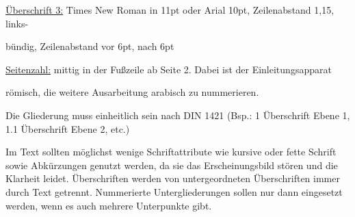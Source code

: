 \hspace{10mm}\underline{Überschrift 3:} Times New Roman in 11pt oder Arial 10pt, Zeilenabstand 1,15, links-

\hspace{10mm}bündig, Zeilenabstand vor 6pt, nach 6pt 

\hspace{10mm}\underline{Seitenzahl:} mittig in der Fußzeile ab Seite 2. Dabei ist der Einleitungsapparat 

\hspace{10mm} römisch, die weitere Ausarbeitung arabisch zu nummerieren.  


$\;$\\

Die Gliederung muss einheitlich sein nach DIN 1421 (Bsp.: 1 Überschrift Ebene 1, 1.1 Überschrift Ebene 2, etc.)

Im Text sollten möglichst wenige Schriftattribute wie kursive oder fette Schrift sowie Abkürzungen genutzt werden, da sie das Erscheinungsbild stören und die Klarheit leidet. Überschriften werden von untergeordneten Überschriften immer durch Text getrennt. Nummerierte Untergliederungen sollen nur dann eingesetzt werden, wenn es auch mehrere Unterpunkte gibt.
